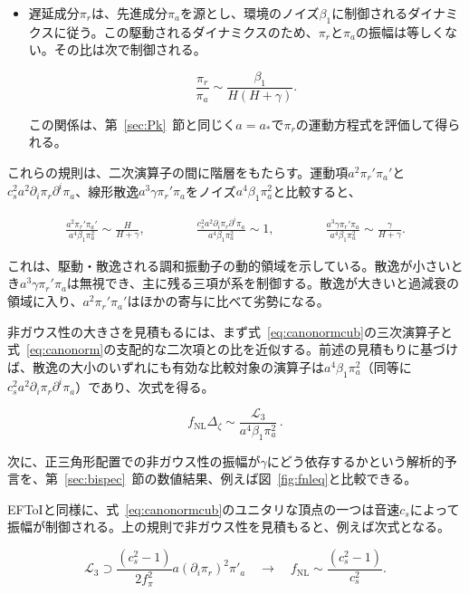 \documentclass[a4paper,11pt]{ltjsarticle}
\numberwithin{equation}{section}
\def\pia{\pi_{a}}
\def\pir{\pi_{r}}
\newcommand{\Eq}[1]{Eq.~(\ref{#1})}
\newcommand{\Fig}[1]{Fig.~{\ref{#1}}}
\newcommand{\Sec}[1]{Sec.~\ref{#1}}
\renewcommand{\Eq}[1]{式~\eqref{#1}}
\renewcommand{\Fig}[1]{図~\ref{#1}}
\renewcommand{\Sec}[1]{第~\ref{#1}~節}
\begin{document}
\begin{itemize}
ほかの相互作用にも同じ整合性が成り立つはずである。
\item 遅延成分$\pir$は、先進成分$\pia$を源とし、環境のノイズ$\beta_1$に制御されるダイナミクスに従う\cite{kamenev_2011}。この駆動されるダイナミクスのため、$\pir$と$\pia$の振幅は等しくない。その比は次で制御される。

\begin{equation}\label{eq:rule5}
        \frac{\pir}{\pia} \sim \frac{\beta_1}{H(H+\gamma)}.
    \end{equation}

この関係は、\Sec{sec:Pk}と同じく$a=a_*$で$\pir$の運動方程式を評価して得られる。
\end{itemize}

これらの規則は、二次演算子の間に階層をもたらす。運動項$a^2\pir'\pia'$と$c_s^2a^2\partial_i\pir\partial^i\pia$、線形散逸$a^3\gamma\pir'\pia$をノイズ$a^4\beta_1\pia^2$と比較すると、

\begin{align}\label{eq:quad1}
    \frac{a^2 \pir'\pia'}{a^{4} \beta_1 \pia^2} \sim \frac{H}{H+\gamma}, \qquad  \qquad  \frac{c_s^2 a^2 \partial_i \pir \partial^i \pia}{a^{4} \beta_1 \pia^2} \sim 1, \qquad \qquad \frac{a^3\gamma\pir' \pia}{a^{4} \beta_1 \pia^2} \sim \frac{\gamma}{H+\gamma}.
\end{align}

これは、駆動・散逸される調和振動子の動的領域を示している。散逸が小さいとき$a^3\gamma\pir'\pia$は無視でき、主に残る三項が系を制御する。散逸が大きいと過減衰の領域に入り、$a^2\pir'\pia'$はほかの寄与に比べて劣勢になる。

非ガウス性の大きさを見積もるには、まず\Eq{eq:canonormcub}の三次演算子と\Eq{eq:canonorm}の支配的な二次項との比を近似する。前述の見積もりに基づけば、散逸の大小のいずれにも有効な比較対象の演算子は$a^4\beta_1\pia^2$（同等に$c_s^2a^2\partial_i\pir\partial^i\pia$）であり、次式を得る。

\begin{equation}
    f_{\text{NL}}\Delta_{\zeta}\sim\frac{\mathcal{L}_{3}}{a^{4} \beta_1 \pia^2}\,.
\end{equation}

次に、正三角形配置での非ガウス性の振幅が$\gamma$にどう依存するかという解析的予言を、\Sec{sec:bispec}の数値結果、例えば\Fig{fig:fnleq}と比較できる。

EFToIと同様に、\Eq{eq:canonormcub}のユニタリな頂点の一つは音速$c_s$によって振幅が制御される。上の規則で非ガウス性を見積もると、例えば次式となる。

\begin{equation}
	\mathcal{L}_{3} \supset \frac{(c^2_s-1)}{2f_{\pi}^{2}}  a \left(\partial_i \pir \right)^2 \pi'_a \quad \rightarrow \quad f_{\text{NL}}\sim \frac{(c^2_s-1)}{c_{s}^{2}} .
\end{equation}
\end{document}
